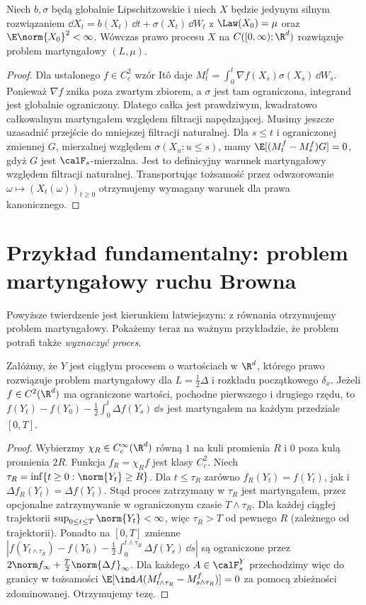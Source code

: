 \begin{twierdzenie}
\label{th:sde-to-mp}
Niech $b,\sigma$ będą globalnie Lipschitzowskie i niech $X$ będzie
jedynym silnym rozwiązaniem
$\dd X_t=b(X_t)\,\dd t+\sigma(X_t)\,\dd W_t$
z $\Law(X_0)=\mu$ oraz $\E\norm{X_0}^2<\infty$.
Wówczas prawo procesu $X$ na $C([0,\infty);\R^d)$ rozwiązuje
problem martyngałowy $(L,\mu)$.
\end{twierdzenie}
\begin{proof}
Dla ustalonego $f\in C_c^2$ wzór Itô daje
$M_t^f=\int_0^t\nabla f(X_s)\sigma(X_s)\,\dd W_s$.
Ponieważ $\nabla f$ znika poza zwartym zbiorem, a $\sigma$ jest
tam ograniczona, integrand jest globalnie ograniczony.
Dlatego całka jest prawdziwym, kwadratowo całkowalnym
martyngałem względem filtracji napędzającej. Musimy jeszcze
uzasadnić przejście do mniejszej filtracji naturalnej.
Dla $s\le t$ i ograniczonej zmiennej $G$, mierzalnej względem
$\sigma(X_u:u\le s)$, mamy $\E[(M_t^f-M_s^f)G]=0$,
gdyż $G$ jest $\calF_s$-mierzalna. Jest to definicyjny
warunek martyngałowy względem filtracji naturalnej.
Transportując tożsamość przez odwzorowanie
$\omega\mapsto(X_t(\omega))_{t\ge0}$ otrzymujemy
wymagany warunek dla prawa kanonicznego.
\end{proof}

\section{Przykład fundamentalny: problem martyngałowy ruchu Browna}

Powyższe twierdzenie jest kierunkiem łatwiejszym: z równania
otrzymujemy problem martyngałowy. Pokażemy teraz na ważnym
przykładzie, że problem potrafi także \emph{wyznaczyć proces}.

\begin{lemat}
\label{lem:mp-cutoff}
Załóżmy, że $Y$ jest ciągłym procesem o wartościach w $\R^d$,
którego prawo rozwiązuje problem martyngałowy dla
$L=\frac12\Delta$ i rozkładu początkowego $\delta_x$.
Jeżeli $f\in C^2(\R^d)$ ma ograniczone wartości,
pochodne pierwszego i drugiego rzędu, to
$f(Y_t)-f(Y_0)-\frac12\int_0^t\Delta f(Y_s)\,\dd s$
jest martyngałem na każdym przedziale $[0,T]$.
\end{lemat}
\begin{proof}
Wybierzmy $\chi_R\in C_c^\infty(\R^d)$ równą $1$ na
kuli promienia $R$ i $0$ poza kulą promienia $2R$.
Funkcja $f_R=\chi_R f$ jest klasy $C_c^2$.
Niech $\tau_R=\inf\{t\ge0:\norm{Y_t}\ge R\}$.
Dla $t\le\tau_R$ zarówno $f_R(Y_t)=f(Y_t)$,
jak i $\Delta f_R(Y_t)=\Delta f(Y_t)$.
Stąd proces zatrzymany w $\tau_R$ jest martyngałem,
przez opcjonalne zatrzymywanie w ograniczonym czasie
$T\wedge\tau_R$. Dla każdej ciągłej trajektorii
$\sup_{0\le t\le T}\norm{Y_t}<\infty$, więc
$\tau_R>T$ od pewnego $R$ (zależnego od trajektorii).
Ponadto na $[0,T]$ zmienne
$|f(Y_{t\wedge\tau_R})-f(Y_0)
-\frac12\int_0^{t\wedge\tau_R}\Delta f(Y_s)\,\dd s|$
są ograniczone przez
$2\norm f_\infty+\frac T2\norm{\Delta f}_\infty$.
Dla każdego $A\in\calF_s^Y$ przechodzimy więc
do granicy w tożsamości
$\E[\ind A(M_{t\wedge\tau_R}^f-M_{s\wedge\tau_R}^f)]=0$
za pomocą zbieżności zdominowanej. Otrzymujemy tezę.
\end{proof}

